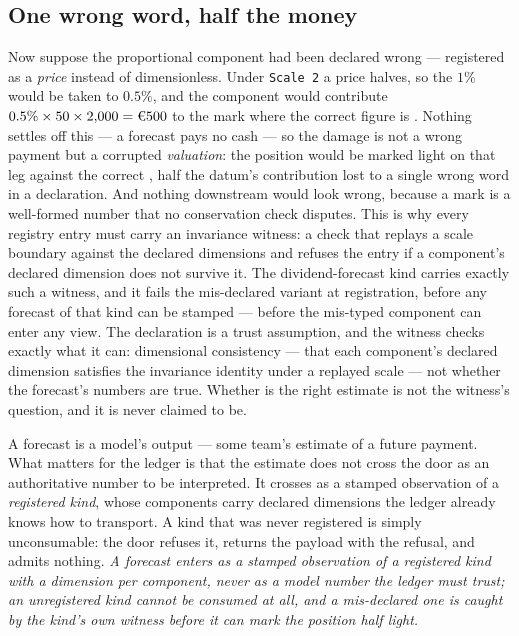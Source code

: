 \subsection{One wrong word, half the money}

Now suppose the proportional component had been declared wrong --- registered as a
\emph{price} instead of dimensionless. Under \texttt{Scale 2} a price halves, so the
$1\%$ would be taken to $0.5\%$, and the component would contribute
$0.5\% \times 50 \times 2{,}000 = \EUR{500}$ to the mark where the correct figure is
. Nothing settles off this --- a forecast pays no cash --- so the damage is
not a wrong payment but a corrupted \emph{valuation}: the position would be marked
 light on that leg against the correct , half the datum's
contribution lost to a single wrong word in a declaration. And nothing downstream would
look wrong, because a mark is a well-formed number that no conservation check disputes.
This is why every registry entry must carry an invariance witness: a check that replays
a scale boundary against the declared dimensions and refuses the entry if a component's
declared dimension does not survive it. The dividend-forecast kind carries exactly such
a witness, and it fails the mis-declared variant at registration, before any forecast
of that kind can be stamped --- before the mis-typed component can enter any view. The
declaration is a trust assumption, and the witness checks exactly what it can:
dimensional consistency --- that each component's declared dimension satisfies the
invariance identity under a replayed scale --- not whether the forecast's numbers are
true. Whether  is the right estimate is not the witness's question, and it is
never claimed to be.

A forecast is a model's output --- some team's estimate of a future payment. What
matters for the ledger is that the estimate does not cross the door as an authoritative
number to be interpreted. It crosses as a stamped observation of a \emph{registered
kind}, whose components carry declared dimensions the ledger already knows how to
transport. A kind that was never registered is simply unconsumable: the door refuses
it, returns the payload with the refusal, and admits nothing. \emph{A forecast enters as a stamped
observation of a registered kind with a dimension per component, never as a model
number the ledger must trust; an unregistered kind cannot be consumed at all, and a
mis-declared one is caught by the kind's own witness before it can mark the position
half light.}
